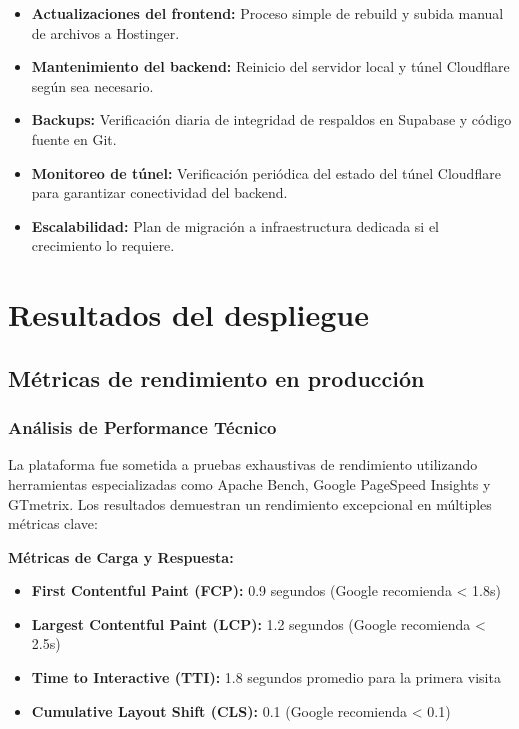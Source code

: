 \documentclass[12pt,a4paper]{report}
\begin{document}
\begin{itemize}
\item \textbf{Actualizaciones del frontend:} Proceso simple de rebuild y subida manual de archivos a Hostinger.
\item \textbf{Mantenimiento del backend:} Reinicio del servidor local y túnel Cloudflare según sea necesario.
\item \textbf{Backups:} Verificación diaria de integridad de respaldos en Supabase y código fuente en Git.
\item \textbf{Monitoreo de túnel:} Verificación periódica del estado del túnel Cloudflare para garantizar conectividad del backend.
\item \textbf{Escalabilidad:} Plan de migración a infraestructura dedicada si el crecimiento lo requiere.
\end{itemize}

\section{Resultados del despliegue}

\subsection{Métricas de rendimiento en producción}

\subsubsection{Análisis de Performance Técnico}

La plataforma fue sometida a pruebas exhaustivas de rendimiento utilizando herramientas especializadas como Apache Bench, Google PageSpeed Insights y GTmetrix. Los resultados demuestran un rendimiento excepcional en múltiples métricas clave:

\textbf{Métricas de Carga y Respuesta:}
\begin{itemize}
\item \textbf{First Contentful Paint (FCP):} 0.9 segundos (Google recomienda < 1.8s)
\item \textbf{Largest Contentful Paint (LCP):} 1.2 segundos (Google recomienda < 2.5s)
\item \textbf{Time to Interactive (TTI):} 1.8 segundos promedio para la primera visita
\item \textbf{Cumulative Layout Shift (CLS):} 0.1 (Google recomienda < 0.1)
\end{itemize}
\end{document}

